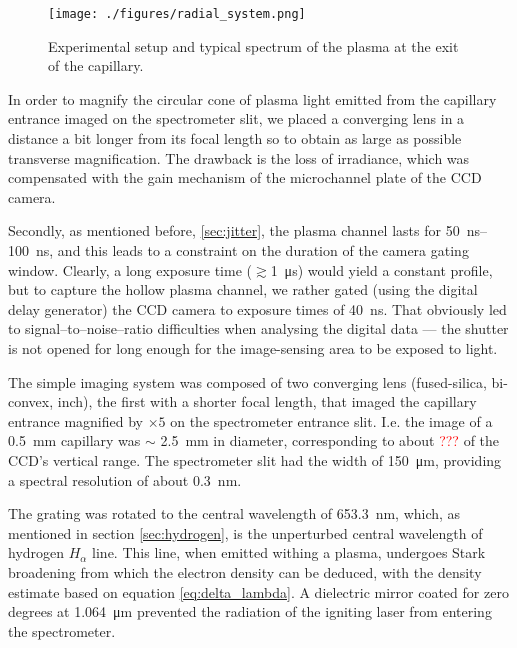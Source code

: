 \documentclass[nofonts]{tufte-book}
\begin{document}
	\begin{figure}
	    \texttt{[image: ./figures/radial\_system.png]}
	    \caption{Experimental setup and typical spectrum of the plasma at the exit of the capillary.}
	    \label{fig:radial_system}
	\end{figure}

In order to magnify the circular cone of plasma light emitted from the capillary entrance imaged on the spectrometer slit, we placed a converging lens in a distance a bit longer from its focal length so to obtain as large as possible transverse magnification. The drawback is the loss of irradiance, which was compensated with the gain mechanism of the microchannel plate of the CCD camera.

Secondly, as mentioned before, \ref{sec:jitter}, the plasma channel lasts for \SIrange{50}{100}{\ns}, and this leads to a constraint on the duration of the camera gating window. Clearly, a long exposure time ($\gtrsim$\SI{1}{\us}) would yield a constant profile, but to capture the hollow plasma channel, we rather gated (using the digital delay generator) the CCD camera to exposure times of \SI{40}{\ns}. That obviously led to signal--to--noise--ratio difficulties when analysing the digital data --- the shutter is not opened for long enough for the image-sensing area to be exposed to light.

The simple imaging system was composed of two converging lens (fused-silica, bi-convex,  inch), the first with a shorter focal length, that imaged the capillary entrance magnified by $\times 5$ on the spectrometer entrance slit. I.e. the image of a \SI{0.5}{\mm} capillary was $\sim$ \SI{2.5}{\mm} in diameter, corresponding to about \textcolor{red}{???} of the CCD's vertical range. The spectrometer slit had the width of \SI{150}{\micro\metre}, providing a spectral resolution of about \SI{0.3}{\nm}.

The grating was rotated to the central wavelength of \SI{653.3}{\nm}, which, as mentioned in section \ref{sec:hydrogen}, is the unperturbed central wavelength of hydrogen $H_\alpha$ line. This line, when emitted withing a plasma, undergoes Stark broadening from which the electron density can be deduced, with the density estimate based on equation \ref{eq:delta_lambda}. A dielectric mirror coated for zero degrees at \SI{1.064}{\um} prevented the radiation of the igniting laser from entering the spectrometer.
\end{document}
